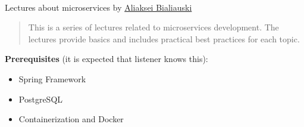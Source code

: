 \documentclass[nobrand,anonymous,nodate,nosecurity]{../solvd}
\begin{document}
{
    \\
    Lectures about microservices by \href{h1alexbel.github.io/about-me.html}{Aliaksei Bialiauski}

    \begin{abstract}
        This is a series of lectures related to microservices development.
        The lectures provide basics and includes practical best practices for each topic.
    \end{abstract}

    \textbf{Prerequisites} (it is expected that listener knows this):
    \begin{itemize}
        \item Spring Framework
        \item PostgreSQL
        \item Containerization and Docker
    \end{itemize}

}
\end{document}
